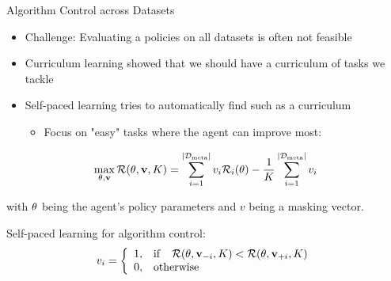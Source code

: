\begin{frame}[c]{Algorithm Control across Datasets }
	
	\begin{itemize}
		\item Challenge: Evaluating a policies on all datasets is often not feasible
		\item Curriculum learning  showed that we should have a curriculum of tasks we tackle
		\item Self-paced learning  tries to automatically find such as a curriculum
		\begin{itemize}
			\item Focus on "easy" tasks where the agent can improve most:
		\end{itemize}
	\end{itemize}
	
\begin{equation} 
\label{spl_loss}
\max_{\theta,\mathbf{v}}\mathcal{R}(\theta, \mathbf{v}, K) = \sum^{|\mathcal{D}_{\text{meta}}|}_{i=1} v_i\mathcal{R}_i(\theta) - \frac{1}{K} \sum^{|\mathcal{D}_{\text{meta}}|}_{i=1} v_i \nonumber
\end{equation}

with $\theta$ being the agent's policy parameters and $v$ being a masking vector.

\pause
\medskip

Self-paced learning for algorithm control:
\begin{equation}
v_i = \left\{
\begin{array}{ll}
1, &  \mathrm{if}\quad\mathcal{R}(\theta, \mathbf{v}_{-i}, K) < \mathcal{R}(\theta, \mathbf{v}_{+i}, K)\\
0, & \mathrm{otherwise}
\end{array}
\right.\nonumber
\end{equation}
\end{frame}


